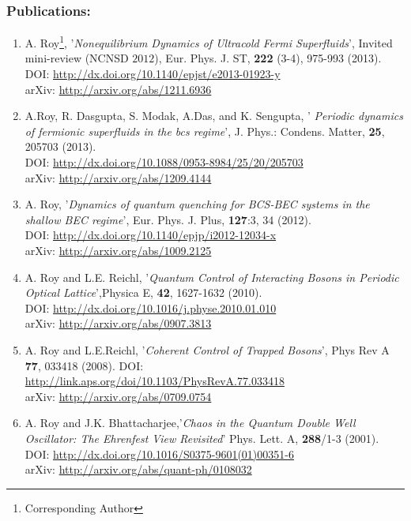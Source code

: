 \documentclass[a4paper,11pt,color]{article}
\begin{document}
\subsubsection{\sc Publications:}
\begin{enumerate}
\item
A. Roy\footnote{Corresponding Author}, '\textit{Nonequilibrium Dynamics of Ultracold Fermi Superfluids}', Invited mini-review (NCNSD $2012$),
Eur. Phys. J. ST, {\bf 222} (3-4), 975-993 (2013).\\
DOI: \url{http://dx.doi.org/10.1140/epjst/e2013-01923-y}\\
arXiv: \url{http://arxiv.org/abs/1211.6936}
\item
A.Roy\footnotemark[\value{footnote}] , R. Dasgupta, S. Modak, A.Das, and K. Sengupta, '\textit{ Periodic dynamics of fermionic superfluids in the bcs regime}',  J. Phys.: Condens. Matter, {\bf 25}, 205703 (2013).\\
DOI: \url{http://dx.doi.org/10.1088/0953-8984/25/20/205703}\\
arXiv: \url{http://arxiv.org/abs/1209.4144}
\item
A. Roy\footnotemark[\value{footnote}] , '\textit{Dynamics of quantum quenching for BCS-BEC systems in the shallow BEC regime}', Eur. Phys. J. {Plus}, {\bf 127}:3, 34 (2012).\\
DOI: \url{http://dx.doi.org/10.1140/epjp/i2012-12034-x} \\
arXiv: \url{http://arxiv.org/abs/1009.2125}
 \item 
A. Roy and L.E. Reichl\footnotemark[\value{footnote}], '\textit{Quantum Control  of Interacting Bosons in Periodic Optical Lattice}',Physica {E}, {\bf 42}, 1627-1632 (2010).\\ DOI: \url{http://dx.doi.org/10.1016/j.physe.2010.01.010}\\
arXiv: \url{http://arxiv.org/abs/0907.3813}
\item
A. Roy and L.E.Reichl\footnotemark[\value{footnote}], '\textit{Coherent Control of Trapped Bosons}', Phys Rev {A} {\bf 77}, 033418 (2008). DOI: \url{http://link.aps.org/doi/10.1103/PhysRevA.77.033418}\\
arXiv: \url{http://arxiv.org/abs/0709.0754}
\item
A. Roy and J.K. Bhattacharjee\footnotemark[\value{footnote}],'\textit{Chaos in the Quantum Double Well Oscillator: The Ehrenfest View Revisited}' Phys. Lett. {A}, {\bf 288}/1-3 (2001).\\
 DOI: \url{http://dx.doi.org/10.1016/S0375-9601(01)00351-6}\\
 arXiv: \url{http://arxiv.org/abs/quant-ph/0108032}
\end{enumerate}
\end{document}
